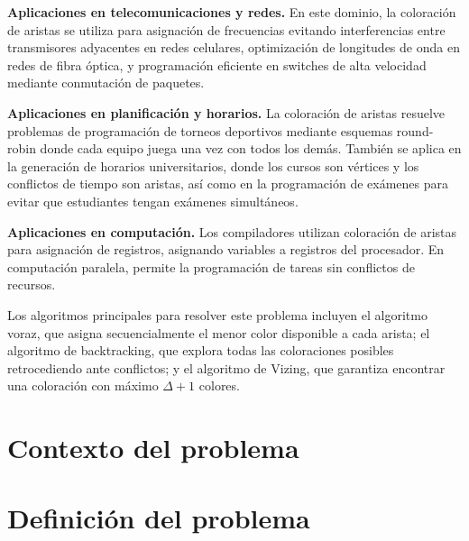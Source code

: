 \documentclass{article}
\begin{document}
\textbf{Aplicaciones en telecomunicaciones y redes.} En este dominio, la coloración de aristas se utiliza para asignación de frecuencias evitando interferencias entre transmisores adyacentes en redes celulares, optimización de longitudes de onda en redes de fibra óptica, y programación eficiente en switches de alta velocidad mediante conmutación de paquetes.

\textbf{Aplicaciones en planificación y horarios.} La coloración de aristas resuelve problemas de programación de torneos deportivos mediante esquemas round-robin donde cada equipo juega una vez con todos los demás. También se aplica en la generación de horarios universitarios, donde los cursos son vértices y los conflictos de tiempo son aristas, así como en la programación de exámenes para evitar que estudiantes tengan exámenes simultáneos.

\textbf{Aplicaciones en computación.} Los compiladores utilizan coloración de aristas para asignación de registros, asignando variables a registros del procesador. En computación paralela, permite la programación de tareas sin conflictos de recursos.

Los algoritmos principales para resolver este problema incluyen el algoritmo voraz, que asigna secuencialmente el menor color disponible a cada arista; el algoritmo de backtracking, que explora todas las coloraciones posibles retrocediendo ante conflictos; y el algoritmo de Vizing, que garantiza encontrar una coloración con máximo $\Delta+1$ colores.

\section*{Contexto del problema}

\section*{Definición del problema}

\newpage
\nocite{*}


\end{document}
